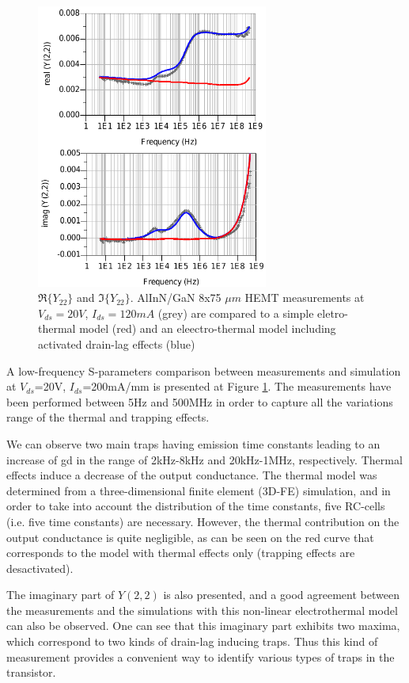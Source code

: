 \documentclass[conference]{IEEEtran}
\begin{document}
\begin{figure}[ht!] %
\centering
\includegraphics[width=3.0in]{Compare_S.pdf}
\caption{$\Re\{Y_{22}\}$ and $\Im\{Y_{22}\}$. AlInN/GaN 8x75 $\mu m$ HEMT measurements at $V_{ds}=20V$, $I_{ds}=120mA$ (grey) are compared to a simple eletro-thermal model (red) and an eleectro-thermal model including activated drain-lag effects (blue)}
\label{Compare_S}
\end{figure}

A low-frequency S-parameters comparison between measurements and simulation at $V_{ds}$=20V, $I_{ds}$=200mA/mm is presented at Figure \ref{Compare_S}. The measurements have been performed between 5Hz and 500MHz in order to capture all the variations range of the thermal and trapping effects.

We can observe two main traps having emission time constants leading to an increase of gd in the range of 2kHz-8kHz and 20kHz-1MHz, respectively. Thermal effects induce a decrease of the output conductance. The thermal model was determined from a three-dimensional finite element (3D-FE) simulation, and in order to take into account the distribution of the time constants, five RC-cells (i.e. five time constants) are necessary. However, the thermal contribution on the output conductance is quite negligible, as can be seen on the red curve that corresponds to the model with thermal effects only (trapping effects are desactivated).

The imaginary part of $Y(2,2)$ is also presented, and a good agreement between the measurements and the simulations with this non-linear electrothermal model can also be observed. One can see that this imaginary part exhibits two maxima, which correspond to two kinds of drain-lag inducing traps. Thus this kind of measurement provides a convenient way to identify various types of traps in the transistor. 
\end{document}
